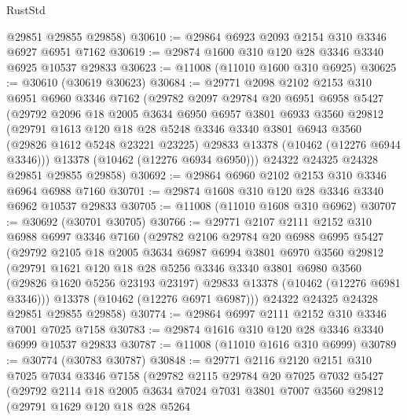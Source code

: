 \begin{lexlean}{RustStd}
\begin{coremodule}
      @29851
      @29855
      @29858)
@30610 := @29864 @6923 @2093 @2154 @310 @3346 @6927 @6951 @7162
@30619 := @29874 @1600 @310 @120 @28 @3346 @3340 @6925 @10537 @29833
@30623 := @11008 (@11010 @1600 @310 @6925)
@30625 := @30610 (@30619 @30623)
@30684 := @29771
    @2098
    @2102
    @2153
    @310
    @6951
    @6960
    @3346
    @7162
    (@29782
      @2097
      @29784
      @20
      @6951
      @6958
      @5427
      (@29792
        @2096
        @18
        @2005
        @3634
        @6950
        @6957
        @3801
        @6933
        @3560
        @29812
        (@29791
          @1613
          @120
          @18
          @28
          @5248
          @3346
          @3340
          @3801
          @6943
          @3560
          (@29826 @1612 @5248 @23221 @23225)
          @29833
          @13378
          (@10462 (@12276 @6944 @3346)))
        @13378
        (@10462 (@12276 @6934 @6950)))
      @24322
      @24325
      @24328
      @29851
      @29855
      @29858)
@30692 := @29864 @6960 @2102 @2153 @310 @3346 @6964 @6988 @7160
@30701 := @29874 @1608 @310 @120 @28 @3346 @3340 @6962 @10537 @29833
@30705 := @11008 (@11010 @1608 @310 @6962)
@30707 := @30692 (@30701 @30705)
@30766 := @29771
    @2107
    @2111
    @2152
    @310
    @6988
    @6997
    @3346
    @7160
    (@29782
      @2106
      @29784
      @20
      @6988
      @6995
      @5427
      (@29792
        @2105
        @18
        @2005
        @3634
        @6987
        @6994
        @3801
        @6970
        @3560
        @29812
        (@29791
          @1621
          @120
          @18
          @28
          @5256
          @3346
          @3340
          @3801
          @6980
          @3560
          (@29826 @1620 @5256 @23193 @23197)
          @29833
          @13378
          (@10462 (@12276 @6981 @3346)))
        @13378
        (@10462 (@12276 @6971 @6987)))
      @24322
      @24325
      @24328
      @29851
      @29855
      @29858)
@30774 := @29864 @6997 @2111 @2152 @310 @3346 @7001 @7025 @7158
@30783 := @29874 @1616 @310 @120 @28 @3346 @3340 @6999 @10537 @29833
@30787 := @11008 (@11010 @1616 @310 @6999)
@30789 := @30774 (@30783 @30787)
@30848 := @29771
    @2116
    @2120
    @2151
    @310
    @7025
    @7034
    @3346
    @7158
    (@29782
      @2115
      @29784
      @20
      @7025
      @7032
      @5427
      (@29792
        @2114
        @18
        @2005
        @3634
        @7024
        @7031
        @3801
        @7007
        @3560
        @29812
        (@29791
          @1629
          @120
          @18
          @28
          @5264

\end{coremodule}
\end{lexlean}
